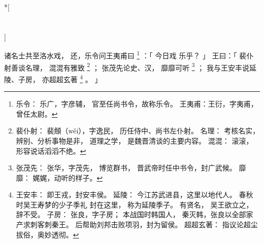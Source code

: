 
\switchcolumn[0]*[\section{}]

诸名士共至洛水戏，
还，乐令问王夷甫曰%
\footnote{%
    乐令：
        乐广，字彦辅，
        官至任尚书令，故称乐令。
    王夷甫：王衍，字夷甫，曾任太尉。
}%
：「
    今日戏
    乐乎？
」
王曰：「
    裴仆射善谈名理，
    混混有雅致%
    \footnote{%
        裴仆射：
            裴頠（wěi），字逸民，
            历任侍中、尚书左仆射。
        名理：
            考核名实，辨别、分析事物是非，
            道理之学，
            是魏晋清谈的主要内容。
        混混：
            滚滚，形容说话滔滔不绝。
    }%
    ；
    张茂先论史、汉，
    靡靡可听%
    \footnote{%
        张茂先：
            张华，字茂先，
            博览群书，
            晋武帝时任中书令，封广武候。
        靡靡：
            娓娓，动听的样子。
    }%
    ；
    我与王安丰说延陵、子房，
    亦超超玄著%
    \footnote{%
        王安丰：
            即王戎，封安丰侯。
        延陵：
            今江苏武进县，这里以地代人。
            春秋时吴王寿梦的少子季礼
            封在这里，
            称为延陵季子。
            有贤名，
            吴王欲立之，辞不受。
        子房：
            张良，字子房；
            本战国时韩国人，
            秦灭韩，张良以全部家产求刺客刺秦王。
            后帮助刘邦击败项羽，封为留侯。
        超超玄著：
            指议论超尘拔俗，奥妙透彻。
    }%
    。
」

\switchcolumn



